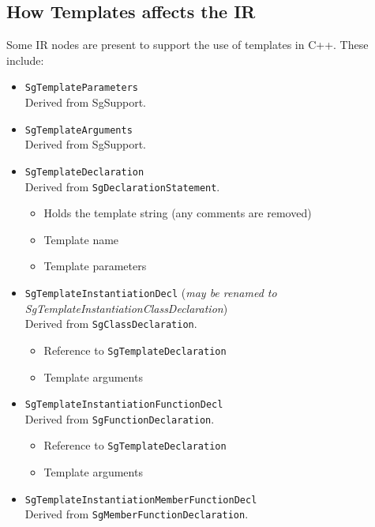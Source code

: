 \subsection{ How Templates affects the IR }
   Some IR nodes are present to support the use of templates in C++. These include:
\begin{itemize}
     \item {\tt SgTemplateParameters} \\
           Derived from SgSupport.

     \item {\tt SgTemplateArguments} \\
           Derived from SgSupport.

     \item {\tt SgTemplateDeclaration} \\
           Derived from {\tt SgDeclarationStatement}.
          \begin{itemize}
               \item Holds the template string (any comments are removed)
               \item Template name
               \item Template parameters
          \end{itemize}
     \item {\tt SgTemplateInstantiationDecl} ({\em may be renamed to SgTemplateInstantiationClassDeclaration}) \\
           Derived from {\tt SgClassDeclaration}.
          \begin{itemize}
               \item Reference to {\tt SgTemplateDeclaration}
               \item Template arguments
          \end{itemize}
     \item {\tt SgTemplateInstantiationFunctionDecl} \\
           Derived from {\tt SgFunctionDeclaration}.
          \begin{itemize}
               \item Reference to {\tt SgTemplateDeclaration}
               \item Template arguments
          \end{itemize}
     \item {\tt SgTemplateInstantiationMemberFunctionDecl} \\
           Derived from {\tt SgMemberFunctionDeclaration}.
          \begin{itemize}

\end{itemize}
\end{itemize}
